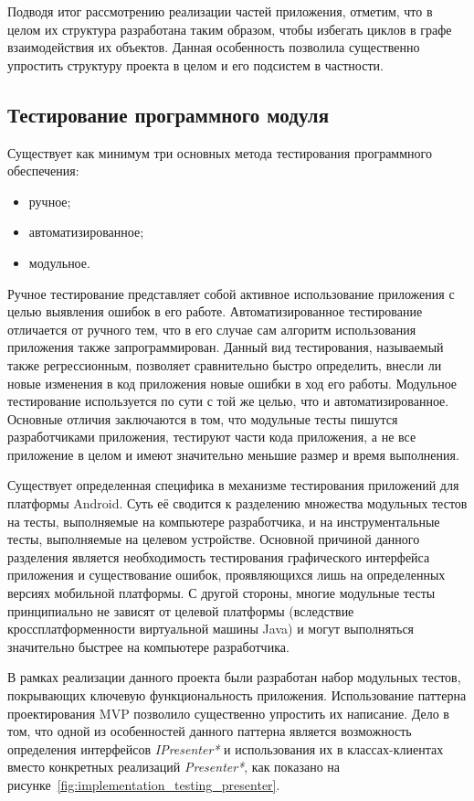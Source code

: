 Подводя итог рассмотрению реализации частей приложения, отметим,
что в целом их структура разработана таким образом,
чтобы избегать циклов в графе взаимодействия их объектов.
Данная особенность позволила существенно упростить
структуру проекта в целом и его подсистем в частности.

\subsection{Тестирование программного модуля}

Существует как минимум три основных метода тестирования
программного обеспечения:
\begin{itemize}
\item ручное;
\item автоматизированное;
\item модульное.
\end{itemize}

Ручное тестирование представляет собой активное использование приложения
с целью выявления ошибок в его работе.
Автоматизированное тестирование отличается от ручного тем,
что в его случае сам алгоритм использования приложения также запрограммирован.
Данный вид тестирования, называемый также регрессионным,
позволяет сравнительно быстро определить,
внесли ли новые изменения в код приложения новые ошибки в ход его работы.
Модульное тестирование используется по сути с той же целью,
что и автоматизированное. Основные отличия заключаются в том,
что модульные тесты пишутся разработчиками приложения,
тестируют части кода приложения, а не все приложение в целом
и имеют значительно меньшие размер и время выполнения.

Существует определенная специфика в механизме тестирования приложений
для платформы Android. Суть её сводится к разделению множества модульных тестов
на тесты, выполняемые на компьютере разработчика, и на инструментальные тесты,
выполняемые на целевом устройстве.
Основной причиной данного разделения является необходимость тестирования
графического интерфейса приложения и существование ошибок,
проявляющихся лишь на определенных версиях мобильной платформы.
С другой стороны, многие модульные тесты принципиально не зависят от
целевой платформы (вследствие кроссплатформенности виртуальной машины Java)
и могут выполняться значительно быстрее на компьютере разработчика.

В рамках реализации данного проекта были разработан набор модульных тестов,
покрывающих ключевую функциональность приложения.
Использование паттерна проектирования MVP позволило существенно упростить их написание.
Дело в том, что одной из особенностей данного паттерна является возможность
определения интерфейсов \textit{IPresenter*} и использования
их в классах-клиентах вместо конкретных реализаций \textit{Presenter*},
как показано на рисунке~\ref{fig:implementation_testing_presenter}.

